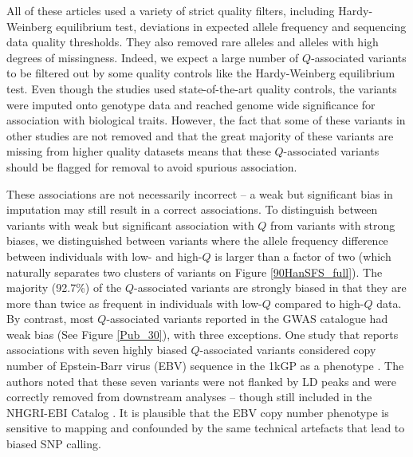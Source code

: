 \documentclass[9pt,lineno]{template}
\begin{document}
All of these articles used a variety of strict quality filters, including Hardy-Weinberg equilibrium test, deviations in expected allele frequency and sequencing data quality thresholds.
They also removed rare alleles and alleles with high degrees of missingness.
Indeed, we expect a large number of $Q$-associated variants to be filtered out by some quality controls like the Hardy-Weinberg equilibrium test.
Even though the studies used state-of-the-art quality controls, the variants were imputed onto genotype data and reached genome wide significance for association with biological traits.
However, the fact that some of these variants in other studies are not removed and that the great majority of these variants are missing from higher quality datasets means that these $Q$-associated variants should be flagged for removal to avoid spurious association.

These associations are not necessarily incorrect -- a weak but significant bias in imputation may still result in a correct associations.
To distinguish between variants with weak but significant association with $Q$ from variants with strong biases, we distinguished between variants where the allele frequency difference between individuals with low- and high-$Q$ is larger than a factor of two (which naturally separates two clusters of variants on Figure \ref{90HanSFS_full}).
The majority (92.7\%) of the $Q$-associated variants are strongly biased in that they are more than twice as frequent in individuals with low-$Q$ compared to high-$Q$ data.
By contrast, most $Q$-associated variants reported in the GWAS catalogue had weak bias (See Figure \ref{Pub_30}), with three exceptions.
One study that reports associations with seven highly biased $Q$-associated variants considered copy number of Epstein-Barr virus (EBV) sequence in the 1kGP as a phenotype \citep{Mandage2017}. 
The authors noted that these seven variants were not flanked by LD peaks and were correctly removed from downstream analyses -- though still included in the NHGRI-EBI Catalog \citep{Mandage2017}.
It is plausible that the EBV copy number phenotype is sensitive to mapping and confounded by the same technical artefacts that lead to biased SNP calling.
\end{document}
